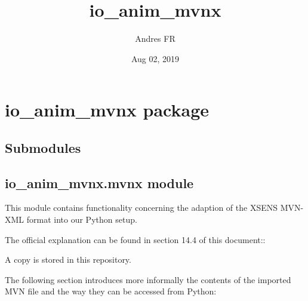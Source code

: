 \documentclass[letterpaper,10pt,english,openany,oneside]{sphinxmanual}
\title{io\_anim\_mvnx}
\date{Aug 02, 2019}
\author{Andres FR}
\begin{document}
\pagestyle{empty}
\sphinxmaketitle
\pagestyle{plain}
\sphinxtableofcontents
\pagestyle{normal}
\label{\detokenize{index::doc}}



\chapter{io\_anim\_mvnx package}
\label{\detokenize{io_anim_mvnx:io-anim-mvnx-package}}\label{\detokenize{io_anim_mvnx::doc}}

\section{Submodules}
\label{\detokenize{io_anim_mvnx:submodules}}

\section{io\_anim\_mvnx.mvnx module}
\label{\detokenize{io_anim_mvnx:module-io_anim_mvnx.mvnx}}\label{\detokenize{io_anim_mvnx:io-anim-mvnx-mvnx-module}}
This module contains functionality concerning the adaption of the
XSENS MVN-XML format into our Python setup.
\begin{description}
\item[{The official explanation can be found in section 14.4 of this document::}] \leavevmode
{}

\end{description}

A copy is stored in this repository.

The following section introduces more informally the contents of the imported
MVN file and the way they can be accessed from Python:
\end{document}
